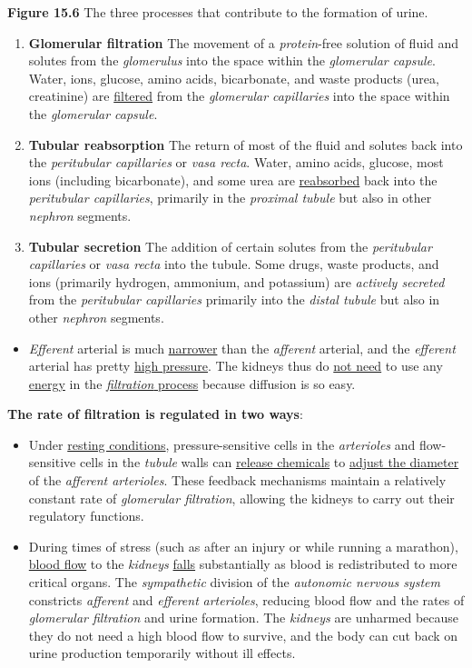 \documentclass[11pt]{article}
\begin{document}
\textbf{Figure 15.6} The three processes that contribute to the formation of urine.
\begin{enumerate}
\item \textbf{Glomerular filtration} The movement of a \emph{protein}-free solution of fluid and
solutes from the \emph{glomerulus} into the space within the \emph{glomerular
capsule}. Water, ions, glucose, amino acids, bicarbonate, and waste products
(urea, creatinine) are \uline{filtered} from the \emph{glomerular capillaries} into the
space within the \emph{glomerular capsule}.
\item \textbf{Tubular reabsorption} The return of most of the fluid and solutes back into
the \emph{peritubular capillaries} or \emph{vasa recta}. Water, amino acids, glucose, most
ions (including bicarbonate), and some urea are \uline{reabsorbed} back into the
\emph{peritubular capillaries}, primarily in the \emph{proximal tubule} but also in other
\emph{nephron} segments.
\item \textbf{Tubular secretion} The addition of certain solutes from the \emph{peritubular
capillaries} or \emph{vasa recta} into the tubule. Some drugs, waste products, and
ions (primarily hydrogen, ammonium, and potassium) are \emph{actively secreted} from
the \emph{peritubular capillaries} primarily into the \emph{distal tubule} but also in
other \emph{nephron} segments.
\end{enumerate}


\begin{itemize}
\item \emph{Efferent} arterial is much \uline{narrower} than the \emph{afferent} arterial, and the
\emph{efferent} arterial has pretty \uline{high pressure}. The kidneys thus do \uline{not need} to
use any \uline{energy} in the \uline{\emph{filtration} process} because diffusion is so easy.
\end{itemize}

\textbf{The rate of filtration is regulated in two ways}:
\begin{itemize}
\item Under \uline{resting conditions}, pressure-sensitive cells in the \emph{arterioles} and
flow-sensitive cells in the \emph{tubule} walls can \uline{release chemicals} to \uline{adjust the
diameter} of the \emph{afferent arterioles}. These feedback mechanisms maintain a
relatively constant rate of \emph{glomerular filtration}, allowing the kidneys to
carry out their regulatory functions.
\item During times of stress (such as after an injury or while running a marathon),
\uline{blood flow} to the \emph{kidneys} \uline{falls} substantially as blood is redistributed to
more critical organs. The \emph{sympathetic} division of the \emph{autonomic nervous system}
constricts \emph{afferent} and \emph{efferent} \emph{arterioles}, reducing blood flow and the rates
of \emph{glomerular filtration} and urine formation. The \emph{kidneys} are unharmed because
they do not need a high blood flow to survive, and the body can cut back on
urine production temporarily without ill effects.
\end{itemize}
\end{document}
